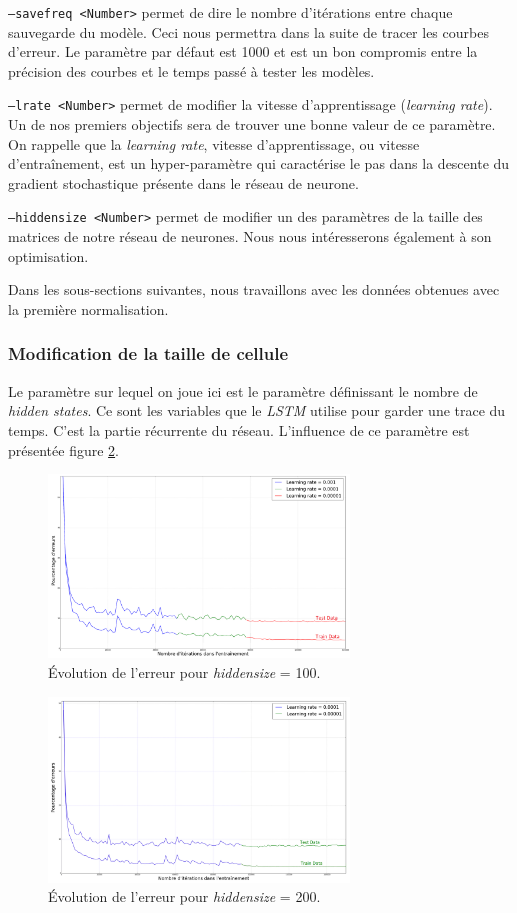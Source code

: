 \documentclass{report}
\begin{document}
\texttt{--savefreq <Number>} permet de dire le nombre d'itérations entre chaque sauvegarde du modèle.
Ceci nous permettra dans la suite de tracer les courbes d'erreur.
Le paramètre par défaut est 1000 et est un bon compromis entre la précision des courbes et le temps passé à tester les modèles.

\texttt{--lrate <Number>} permet de modifier la vitesse d'apprentissage (\textit{learning rate}).
Un de nos premiers objectifs sera de trouver une bonne valeur de ce paramètre.
On rappelle que la \textit{learning rate}, vitesse d'apprentissage, ou vitesse d'entraînement, est un hyper-paramètre qui caractérise le pas dans la descente du gradient stochastique présente dans le réseau de neurone.

\texttt{--hiddensize <Number>} permet de modifier un des paramètres de la taille des matrices de notre réseau de neurones.
Nous nous intéresserons également à son optimisation.

Dans les sous-sections suivantes, nous travaillons avec les données obtenues avec la première normalisation.

\subsubsection{Modification de la taille de cellule}

Le paramètre sur lequel on joue ici est le paramètre définissant le nombre de \textit{hidden states}.
Ce sont les variables que le \textit{LSTM} utilise pour garder une trace du temps.
C'est la partie récurrente du réseau.
L'influence de ce paramètre est présentée figure \ref{err_size}.

\begin{figure}[!h] 
    \center
    \includegraphics[width=8cm]{img/curve_100.png}
    \caption{Évolution de l'erreur pour \textit{hiddensize} = 100.}
    \label{err_size}
\end{figure}

\begin{figure}[!h] 
	\center
	\includegraphics[width=8cm]{img/curve_200.png}
	\caption{Évolution de l'erreur pour \textit{hiddensize} = 200.}
	\label{err_size}
\end{figure}
\end{document}
